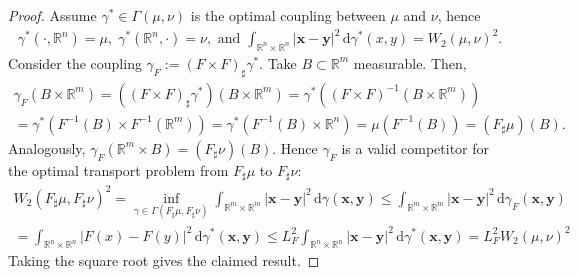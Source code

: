 \documentclass{article}
\theoremstyle{plain}
\theoremstyle{definition}
\theoremstyle{remark}
\newcommand{\x}{\bm{x}}
\newcommand{\y}{\bm{y}}
\newcommand{\bR}{\mathbb{R}}
\newcommand{\rd}{\mathrm{d}}
\begin{document}
\begin{proof}
  Assume $\gamma^* \in \Gamma(\mu, \nu)$ is the optimal coupling between $\mu$ and $\nu$, hence
  \begin{align}
    \gamma^*(\cdot, \bR^n) = \mu, \; \gamma^*(\bR^n, \cdot) = \nu, \text{ and } \int_{\bR^n \times \bR^n} |\x - \y|^2 \, \rd \gamma^*(x, y) = W_2(\mu, \nu)^2.
  \end{align}
  Consider the coupling $\gamma_F := (F \times F) _\sharp \gamma^*$. Take $B \subset \bR^m$ measurable. Then,
  \begin{multline}
    \gamma_F(B \times \bR^m) = ((F \times F) _\sharp \gamma^*)(B \times \bR^m) = \gamma^*( (F \times F)^{-1}(B \times \bR^m) ) \\ = \gamma^*( F^{-1}(B) \times F^{-1}(\bR^m)) = \gamma^* ( F^{-1}(B) \times \bR^n ) = \mu(F^{-1}(B)) = (F _\sharp \mu)(B).
  \end{multline}
  Analogously, $\gamma_F(\bR^m \times B) = (F _\sharp \nu)(B)$. Hence $\gamma_F$ is a valid competitor for the optimal transport problem from $F _\sharp \mu$ to $F _\sharp \nu$:
  \begin{multline}
    W_2(F _\sharp \mu, F _\sharp \nu)^2 = \inf_{\gamma \in \Gamma(F _\sharp \mu, F _\sharp \nu)} \int_{\bR^m \times \bR^m} |\x - \y|^2 \, \rd \gamma(\x, \y)
    \leq \int_{\bR^m \times \bR^m} |\x - \y|^2 \, \rd \gamma_F(\x, \y) \\
    = \int_{\bR^n \times \bR^n} |F(x) - F(y)|^2 \, \rd \gamma^*(\x, \y)
    \leq L_F^2 \int_{\bR^n \times \bR^n} |\x - \y|^2 \, \rd \gamma^*(\x, \y)
    = L_F^2 W_2(\mu, \nu)^2
  \end{multline}
  Taking the square root gives the claimed result.
\end{proof}
\end{document}
